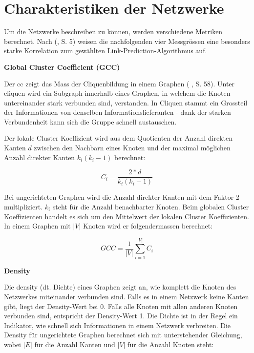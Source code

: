 \section{Charakteristiken der Netzwerke}
Um die Netzwerke beschreiben zu können, werden verschiedene Metriken berechnet.
Nach \citeauthor{gao_link_2015} (\citeyear{gao_link_2015}, S. 5) weisen die nachfolgenden vier Messgrössen eine besonders starke Korrelation zum gewählten Link-Prediction-Algorithmus auf.

\textbf{Global Cluster Coefficient (GCC)}

Der \acs{cc} zeigt das Mass der Cliquenbildung in einem Graphen (\citeauthor{michael_henninger_soziale_2018} \citeyear{michael_henninger_soziale_2018}, S. 58).
Unter \acs{clique}n wird ein Subgraph innerhalb eines Graphen, in welchem die Knoten untereinander stark verbunden sind, verstanden.
In Cliquen stammt ein Grossteil der Informationen von denselben Informationslieferanten - dank der starken Verbundenheit kann sich die Gruppe schnell austauschen.

Der lokale Cluster Koeffizient wird aus dem Quotienten der Anzahl direkten Kanten $d$ zwischen den Nachbarn eines Knoten und der maximal möglichen Anzahl direkter Kanten $k_i(k_i -1)$ berechnet:

\begin{equation}
    \label{eq:ci}
    C_i = \frac{2*d}{k_i(k_i-1)}
\end{equation}

Bei ungerichteten Graphen wird die Anzahl direkter Kanten mit dem Faktor 2 multipliziert. $k_i$ steht für die Anzahl benachbarter Knoten.
Beim globalen Cluster Koeffizienten handelt es sich um den Mittelwert der lokalen Cluster Koeffizienten.
In einem Graphen mit $|V|$ Knoten wird er folgendermassen berechnet:

\begin{equation}
    \label{eq:gcc}
    GCC = \frac{1}{|V|}\sum\limits_{i=1}^{|V|}C_i
\end{equation}

\textbf{Density}

Die \acs{density} (dt. Dichte) eines Graphen zeigt an, wie komplett die Knoten des Netzwerkes miteinander verbunden sind.
Falls es in einem Netzwerk keine Kanten gibt, liegt der Density-Wert bei 0. Falls alle Knoten mit allen anderen Knoten verbunden sind, entspricht der Density-Wert 1.
Die Dichte ist in der Regel ein Indikator, wie schnell sich Informationen in einem Netzwerk verbreiten.
Die Density für ungerichtete Graphen berechnet sich mit unterstehender Gleichung, wobei $|E|$ für die Anzahl Kanten und $|V|$ für die Anzahl Knoten steht:

